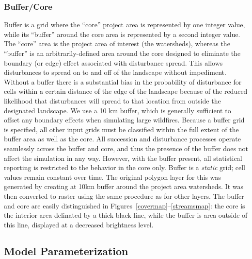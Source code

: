 \subsubsection{Buffer/Core} 
Buffer is a grid where the ``core'' project area is represented by one integer value, while its ``buffer'' around the core area is represented by a second integer value. The ``core'' area is the project area of interest (the watersheds), whereas the ``buffer'' is an arbitrarily-defined area around the core designed to eliminate the boundary (or edge) effect associated with disturbance spread. This allows disturbances to spread on to and off of the landscape without impediment. Without a buffer there is a substantial bias in the probability of disturbance for cells within a certain distance of the edge of the landscape because of the reduced likelihood that disturbances will spread to that location from outside the designated landscape. We use a 10 km buffer, which is generally sufficient to offset any boundary effects when simulating large wildfires. Because a buffer grid is specified, all other input grids must be classified within the full extent of the buffer area as well as the core. All succession and disturbance processes operate seamlessly across the buffer and core, and thus the presence of the buffer does not affect the simulation in any way. However, with the buffer present, all statistical reporting is restricted to the behavior in the core only. Buffer is a \emph{static} grid; cell values remain constant over time. The original polygon layer for this was generated by creating at 10km buffer around the project area watersheds. It was then converted to raster using the same procedure as for other layers. The buffer and core are easily distinguished in Figures~\ref{covermap}--\ref{streamsmap}: the core is the interior area delinated by a thick black line, while the buffer is area outside of this line, displayed at a decreased brightness level.



\subsection{Model Parameterization}
\label{subsec:hrvmodelparam}

